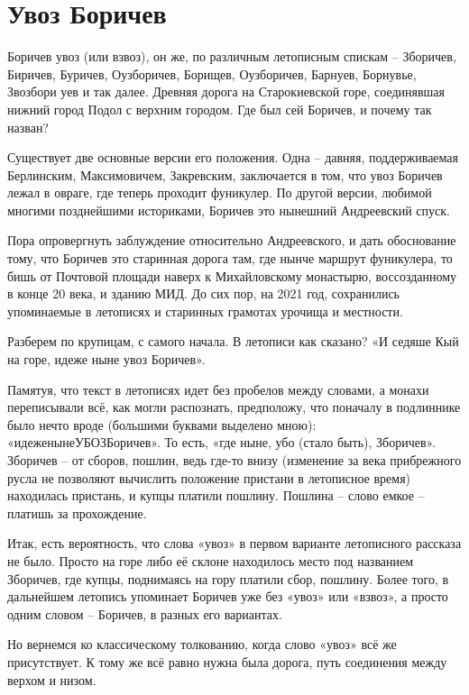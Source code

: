 \chapter {Увоз Боричев}

Боричев увоз (или взвоз), он же, по различным летописным спискам – Зборичев, Биричев, Буричев, Оузборичев, Борищев, Оузборичев, Барнуев, Борнувье, Звозбори уев и так далее. Древняя дорога на Старокиевской горе, соединявшая нижний город Подол с верхним городом. Где был сей Боричев, и почему так назван?

Существует две основные версии его положения. Одна – давняя, поддерживаемая Берлинским, Максимовичем, Закревским, заключается в том, что увоз Боричев лежал в овраге, где теперь проходит фуникулер. По другой версии, любимой многими позднейшими историками, Боричев это нынешний Андреевский спуск.

Пора опровергнуть заблуждение относительно Андреевского, и дать обоснование тому, что Боричев это старинная дорога там, где нынче маршрут фуникулера, то бишь от Почтовой площади наверх к Михайловскому монастырю, воссозданному в конце 20 века, и зданию МИД. До сих пор, на 2021 год, сохранились упоминаемые в летописях и старинных грамотах урочища и местности.

Разберем по крупицам, с самого начала. В летописи как сказано? «И седяше Кый на горе, идеже ныне увоз Боричев».

Памятуя, что текст в летописях идет без пробелов между словами, а монахи переписывали всё, как могли распознать, предположу, что поначалу в подлиннике было нечто вроде (большими буквами выделено мною): «идеженынеУБОЗБоричев». То есть, «где ныне, убо (стало быть), Зборичев». Зборичев – от сборов, пошлин, ведь где-то внизу (изменение за века прибрежного русла не позволяют вычислить положение пристани в летописное время) находилась пристань, и купцы платили пошлину. Пошлина – слово емкое – платишь за прохождение.

Итак, есть вероятность, что слова «увоз» в первом варианте летописного рассказа не было. Просто на горе либо её склоне находилось место под названием Зборичев, где купцы, поднимаясь на гору платили сбор, пошлину. Более того, в дальнейшем летопись упоминает Боричев уже без «увоз» или «взвоз», а просто одним словом – Боричев, в разных его вариантах.

Но вернемся ко классическому толкованию, когда слово «увоз» всё же присутствует. К тому же всё равно нужна была дорога, путь соединения между верхом и низом.

